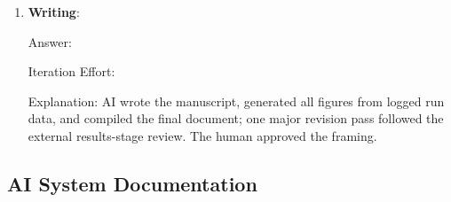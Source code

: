 \begin{enumerate}
    Explanation: AI performed all statistical analysis (pre-registered contrasts, seed-blocked bootstrap, exact sign-flip tests, collapse-mode decomposition), derived and empirically verified the Epps--Pulley stationary-point result, and wrote the interpretation. A second AI system's results-stage review corrected an arithmetic-mean effect size to its geometric value and flagged estimand mismatches, which were adopted. The human reviewed the summary conclusions.

    \item \textbf{Writing}:

    Answer: \involvementD{}

    Iteration Effort: \iterationLow{}

    Explanation: AI wrote the manuscript, generated all figures from logged run data, and compiled the final document; one major revision pass followed the external results-stage review. The human approved the framing.

\end{enumerate}

\subsection*{AI System Documentation}

